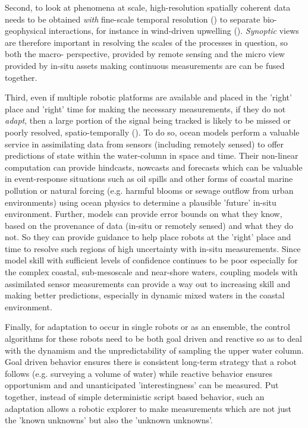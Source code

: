 Second, to look at phenomena at scale, high-resolution spatially
coherent data needs to be obtained \emph{with} fine-scale temporal
resolution () to separate bio-geophysical interactions, for
instance in wind-driven upwelling (). \emph{Synoptic} views
are therefore important in resolving the scales of the processes in
question, so both the macro- perspective, provided by remote sensing
and the micro view provided by in-situ assets making continuous
measurements are can be fused together.

Third, even if multiple robotic platforms are available and placed in
the 'right' place and 'right' time for making the necessary
measurements, if they do not \emph{adapt}, then a large portion of the
signal being tracked is likely to be missed or poorly resolved,
spatio-temporally (). To do so, ocean models perform a
valuable service in assimilating data from sensors (including remotely
sensed) to offer predictions of state within the water-column in space
and time. Their non-linear computation can provide hindcasts, nowcasts
and forecasts which can be valuable in event-response situations such
as oil spills and other forms of coastal marine pollution or natural
forcing (e.g. harmful blooms or sewage outflow from urban
environments) using ocean physics to determine a plausible 'future'
in-situ environment. Further, models can provide error bounds on what
they know, based on the provenance of data (in-situ or remotely
sensed) and what they do not. So they can provide guidance to help
place robots at the 'right' place and time to resolve such regions of
high uncertainty with in-situ measurements.  Since model skill with
sufficient levels of confidence continues to be poor especially for
the complex coastal, sub-mesoscale and near-shore waters, coupling
models with assimilated sensor measurements can provide a way out to
increasing skill and making better predictions, especially in dynamic
mixed waters in the coastal environment.

Finally, for adaptation to occur in single robots or as an ensemble,
the control algorithms for these robots need to be both goal driven
and reactive so as to deal with the dynamism and the unpredictability
of sampling the upper water column. Goal driven behavior ensures there
is consistent long-term strategy that a robot follows (e.g. surveying
a volume of water) while reactive behavior ensures opportunism and and
unanticipated 'interestingness' can be measured. Put together, instead
of simple deterministic script based behavior, such an adaptation
allows a robotic explorer to make measurements which are not just the
'known unknowns' but also the 'unknown unknowns'.

